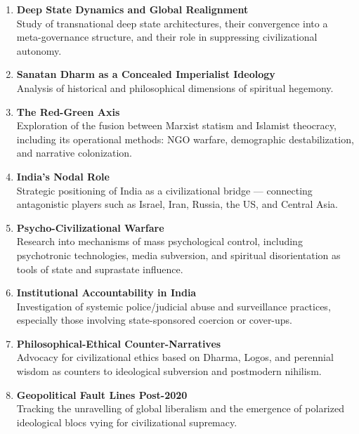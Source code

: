 \begin{enumerate}[label=\textbf{\arabic*.}, leftmargin=*]
	\item \textbf{Deep State Dynamics and Global Realignment} \\
	Study of transnational deep state architectures, their convergence into a meta-governance structure, and their role in suppressing civilizational autonomy.
	
	\item \textbf{Sanatan Dharm as a Concealed Imperialist Ideology} \\
	Analysis of historical and philosophical dimensions of spiritual hegemony.
	
	\item \textbf{The Red-Green Axis} \\
	Exploration of the fusion between Marxist statism and Islamist theocracy, including its operational methods: NGO warfare, demographic destabilization, and narrative colonization.
	
	\item \textbf{India’s Nodal Role} \\
	Strategic positioning of India as a civilizational bridge --- connecting antagonistic players such as Israel, Iran, Russia, the US, and Central Asia.
	
	\item \textbf{Psycho-Civilizational Warfare} \\
	Research into mechanisms of mass psychological control, including psychotronic technologies, media subversion, and spiritual disorientation as tools of state and suprastate influence.
	
	\item \textbf{Institutional Accountability in India} \\
	Investigation of systemic police/judicial abuse and surveillance practices, especially those involving state-sponsored coercion or cover-ups.
	
	\item \textbf{Philosophical-Ethical Counter-Narratives} \\
	Advocacy for civilizational ethics based on Dharma, Logos, and perennial wisdom as counters to ideological subversion and postmodern nihilism.
	
	\item \textbf{Geopolitical Fault Lines Post-2020} \\
	Tracking the unravelling of global liberalism and the emergence of polarized ideological blocs vying for civilizational supremacy.
	

\end{enumerate}

